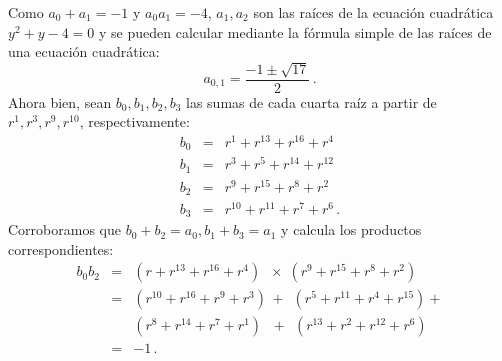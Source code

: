 Como $a_0+a_1=-1$ y $a_0 a_1=-4$, $a_1,a_2$ son las raíces de la ecuación cuadrática $y^2+y-4=0$ y se pueden calcular mediante la fórmula simple de las raíces de una ecuación cuadrática:
\[
a_{0,1} = \frac{-1\pm\sqrt{17}}{2}\,.
\]
Ahora bien, sean $b_0,b_1,b_2,b_3$ las sumas de cada cuarta raíz a partir de $r^1,r^3,r^9,r^{10}$, respectivamente:
\begin{eqnarray*}
b_0&=& r^1+ r^{13} + r^{16} + r^4\\
b_1&=& r^3+ r^{5} + r^{14} + r^{12}\\
b_2&=& r^9+ r^{15} + r^{8} + r^2\\
b_3&=& r^{10}+ r^{11} + r^{7} + r^6\,.
\end{eqnarray*}
Corroboramos que $b_0+b_2=a_0, b_1+b_3=a_1$ y calcula los productos correspondientes:
\begin{eqnarray*}
b_0b_2&=&(r + r^{13} + r^{16} +r^4)\;\;\times\;(r^9 + r^{15} + r^{8} +r^{2})\\
&=&(r^{10}+r^{16}+r^9+r^3)\,+\;\,(r^{5}+r^{11}+r^4+r^{15})+\\
&&(r^{8}+r^{14}+r^7+r^1)\,\;\,+\;\,(r^{13}+r^{2}+r^{12}+r^6)\\
&=&-1\,.
\end{eqnarray*}

